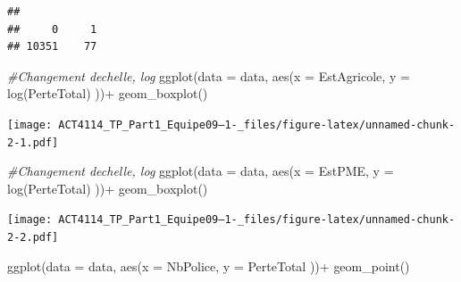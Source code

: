 \documentclass[
]{article}
\newenvironment{Shaded}{\begin{snugshade}}{\end{snugshade}}
\newcommand{\AttributeTok}[1]{\textcolor[rgb]{0.77,0.63,0.00}{#1}}
\newcommand{\CommentTok}[1]{\textcolor[rgb]{0.56,0.35,0.01}{\textit{#1}}}
\newcommand{\DecValTok}[1]{\textcolor[rgb]{0.00,0.00,0.81}{#1}}
\newcommand{\FunctionTok}[1]{\textcolor[rgb]{0.00,0.00,0.00}{#1}}
\newcommand{\NormalTok}[1]{#1}
\newcommand{\OtherTok}[1]{\textcolor[rgb]{0.56,0.35,0.01}{#1}}
\newcommand{\SpecialCharTok}[1]{\textcolor[rgb]{0.00,0.00,0.00}{#1}}
\begin{document}
\begin{Shaded}
\end{Shaded}

\begin{verbatim}
## 
##     0     1 
## 10351    77
\end{verbatim}

\begin{Shaded}
\begin{Highlighting}[]
\CommentTok{\#Changement d\textquotesingle{}echelle, log}
\FunctionTok{ggplot}\NormalTok{(}\AttributeTok{data =}\NormalTok{ data, }\FunctionTok{aes}\NormalTok{(}\AttributeTok{x =}\NormalTok{ EstAgricole, }\AttributeTok{y =} \FunctionTok{log}\NormalTok{(PerteTotal) ))}\SpecialCharTok{+}
  \FunctionTok{geom\_boxplot}\NormalTok{()}
\end{Highlighting}
\end{Shaded}

\texttt{[image: ACT4114\_TP\_Part1\_Equipe09--1-\_files/figure-latex/unnamed-chunk-2-1.pdf]}

\begin{Shaded}
\begin{Highlighting}[]
\CommentTok{\#Changement d\textquotesingle{}echelle, log}
\FunctionTok{ggplot}\NormalTok{(}\AttributeTok{data =}\NormalTok{ data, }\FunctionTok{aes}\NormalTok{(}\AttributeTok{x =}\NormalTok{ EstPME, }\AttributeTok{y =} \FunctionTok{log}\NormalTok{(PerteTotal) ))}\SpecialCharTok{+}
  \FunctionTok{geom\_boxplot}\NormalTok{()}
\end{Highlighting}
\end{Shaded}

\texttt{[image: ACT4114\_TP\_Part1\_Equipe09--1-\_files/figure-latex/unnamed-chunk-2-2.pdf]}

\begin{Shaded}
\begin{Highlighting}[]
\FunctionTok{ggplot}\NormalTok{(}\AttributeTok{data =}\NormalTok{ data, }\FunctionTok{aes}\NormalTok{(}\AttributeTok{x =}\NormalTok{ NbPolice, }\AttributeTok{y =}\NormalTok{ PerteTotal ))}\SpecialCharTok{+}
  \FunctionTok{geom\_point}\NormalTok{()}
\end{Highlighting}
\end{Shaded}
\end{document}
